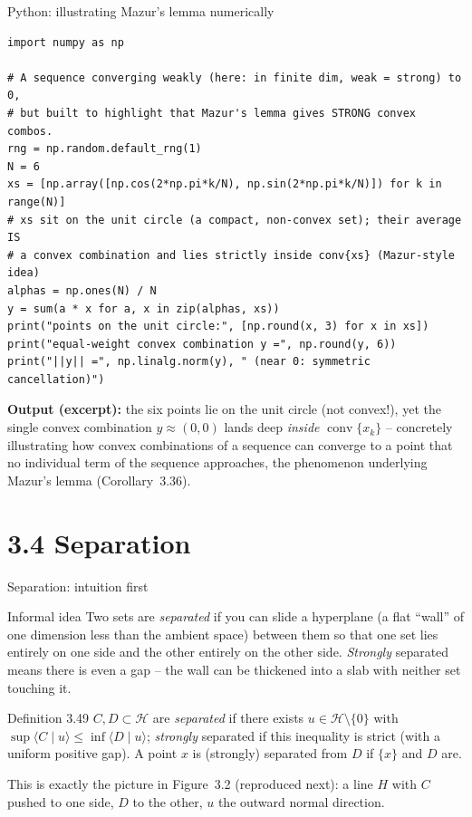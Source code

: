 \documentclass[aspectratio=169,10pt]{beamer}
\newcommand{\Hil}{\mathcal{H}}
\newcommand{\conv}{\operatorname{conv}}
\newcommand{\ip}[2]{\langle #1 \mid #2 \rangle}
\begin{document}
\begin{frame}[fragile]{Python: illustrating Mazur's lemma numerically}
\begin{lstlisting}
import numpy as np

# A sequence converging weakly (here: in finite dim, weak = strong) to 0,
# but built to highlight that Mazur's lemma gives STRONG convex combos.
rng = np.random.default_rng(1)
N = 6
xs = [np.array([np.cos(2*np.pi*k/N), np.sin(2*np.pi*k/N)]) for k in range(N)]
# xs sit on the unit circle (a compact, non-convex set); their average IS
# a convex combination and lies strictly inside conv{xs} (Mazur-style idea)
alphas = np.ones(N) / N
y = sum(a * x for a, x in zip(alphas, xs))
print("points on the unit circle:", [np.round(x, 3) for x in xs])
print("equal-weight convex combination y =", np.round(y, 6))
print("||y|| =", np.linalg.norm(y), " (near 0: symmetric cancellation)")
\end{lstlisting}
\medskip
\textbf{Output (excerpt):} the six points lie on the unit circle (not
convex!), yet the single convex combination $y\approx(0,0)$ lands deep
\emph{inside} $\conv\{x_k\}$ -- concretely illustrating how convex
combinations of a sequence can converge to a point that no individual term
of the sequence approaches, the phenomenon underlying Mazur's lemma
(Corollary~3.36).
\end{frame}

\section{3.4 Separation}

\begin{frame}{Separation: intuition first}
  \begin{block}{Informal idea}
    Two sets are \emph{separated} if you can slide a hyperplane (a flat
    ``wall'' of one dimension less than the ambient space) between them so
    that one set lies entirely on one side and the other entirely on the
    other side. \emph{Strongly} separated means there is even a gap -- the
    wall can be thickened into a slab with neither set touching it.
  \end{block}

  \begin{block}{Definition 3.49}
    $C,D\subset\Hil$ are \emph{separated} if there exists $u\in\Hil
    \setminus\{0\}$ with $\sup\ip{C}{u}\le \inf\ip{D}{u}$; \emph{strongly}
    separated if this inequality is strict (with a uniform positive gap). A
    point $x$ is (strongly) separated from $D$ if $\{x\}$ and $D$ are.
  \end{block}
  This is exactly the picture in Figure~3.2 (reproduced next): a line $H$
  with $C$ pushed to one side, $D$ to the other, $u$ the outward normal
  direction.
\end{frame}
\end{document}
